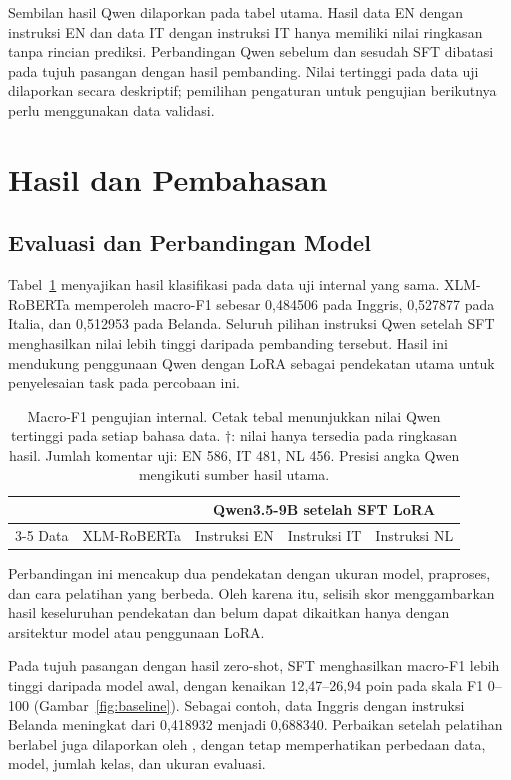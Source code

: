 \documentclass[11pt]{article}
\begin{document}
Sembilan hasil Qwen dilaporkan pada tabel utama. Hasil data EN dengan instruksi EN dan data IT dengan instruksi IT hanya memiliki nilai ringkasan tanpa rincian prediksi. Perbandingan Qwen sebelum dan sesudah SFT dibatasi pada tujuh pasangan dengan hasil pembanding. Nilai tertinggi pada data uji dilaporkan secara deskriptif; pemilihan pengaturan untuk pengujian berikutnya perlu menggunakan data validasi.

\section{Hasil dan Pembahasan}
\subsection{Evaluasi dan Perbandingan Model}
Tabel~\ref{tab:main} menyajikan hasil klasifikasi pada data uji internal yang sama. XLM-RoBERTa memperoleh macro-F1 sebesar 0,484506 pada Inggris, 0,527877 pada Italia, dan 0,512953 pada Belanda. Seluruh pilihan instruksi Qwen setelah SFT menghasilkan nilai lebih tinggi daripada pembanding tersebut. Hasil ini mendukung penggunaan Qwen dengan LoRA sebagai pendekatan utama untuk penyelesaian task pada percobaan ini.

\begin{table}[t]
\centering
\begin{tabular}{lrrrr}
\toprule
& & \multicolumn{3}{c}{Qwen3.5-9B setelah SFT LoRA} \\
\cmidrule(lr){3-5}
Data & XLM-RoBERTa & Instruksi EN & Instruksi IT & Instruksi NL \\
\midrule

\end{tabular}
\caption{Macro-F1 pengujian internal. Cetak tebal menunjukkan nilai Qwen tertinggi pada setiap bahasa data. $\dagger$: nilai hanya tersedia pada ringkasan hasil. Jumlah komentar uji: EN 586, IT 481, NL 456. Presisi angka Qwen mengikuti sumber hasil utama.}
\label{tab:main}
\end{table}

Perbandingan ini mencakup dua pendekatan dengan ukuran model, praproses, dan cara pelatihan yang berbeda. Oleh karena itu, selisih skor menggambarkan hasil keseluruhan pendekatan dan belum dapat dikaitkan hanya dengan arsitektur model atau penggunaan LoRA.

Pada tujuh pasangan dengan hasil zero-shot, SFT menghasilkan macro-F1 lebih tinggi daripada model awal, dengan kenaikan 12,47--26,94 poin pada skala F1 0--100 (Gambar~\ref{fig:baseline}). Sebagai contoh, data Inggris dengan instruksi Belanda meningkat dari 0,418932 menjadi 0,688340. Perbaikan setelah pelatihan berlabel juga dilaporkan oleh \citet{chan-etal-2024-hate}, dengan tetap memperhatikan perbedaan data, model, jumlah kelas, dan ukuran evaluasi.
\end{document}
